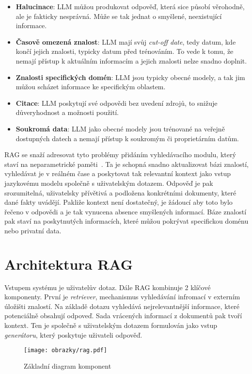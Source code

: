 \begin{itemize}
    \item \textbf{Halucinace}: LLM můžou produkovat odpověď, která sice působí věrohodně, ale je fakticky nesprávná. Může se tak jednat o smyšlené, neexistující informace.
    \item \textbf{Časově omezená znalost}: LLM mají svůj \textit{cut-off date}, tedy datum, kde končí jejich znalosti, typicky datum před trénováním. To vede k tomu, že nemají přístup k aktuálním informacím a jejich znalosti nelze snadno doplnit.
    \item \textbf{Znalosti specifických domén}: LLM jsou typicky obecné modely, a tak jim můžou scházet informace ke specifickým oblastem.
    \item \textbf{Citace}: LLM poskytují své odpovědi bez uvedení zdrojů, to snižuje důveryhodnost a možnosti použití.
    \item \textbf{Soukromá data}: LLM jako obecné modely jsou trénované na veřejně dostupných datech a nemají přístup k soukromým či proprietárním datům.
\end{itemize}

RAG se snaží adresovat tyto problémy přidáním vyhledávacího modulu, který staví na neparametrické paměti~\cite{lewis_rag}. Ta je schopná snadno aktualizovat bázi znalostí, vyhledávat je v reálném čase a poskytovat tak relevantní kontext jako vstup jazykovému modelu společně s uživatelským dotazem. Odpověď je pak srozumitelná, uživatelsky přívětivá a podložena konkrétními dokumenty, které dané fakty uvádějí. Pakliže kontext není dostatečný, je žádoucí aby toto bylo řečeno v odpovědi a je tak vynucena absence smyšlených informací. Báze znalostí pak staví na poskytnutých informacích, které můžou pokrývat specifickou doménu nebo privatní data.

\section{Architektura RAG}
Vstupem systému je uživatelův dotaz. Dále RAG kombinuje 2 klíčové komponenty. První je \textit{retriever}, mechanismus vyhledávání infromací v externím úložišti znalostí. Na základě dotazu vyhledává nejrelevantnější informace, které potenciálně obsahují odpoveď. Sada vrácených informací z dokumentů pak tvoří kontext. Ten je společně s uživatelským dotazem formulován jako vstup \textit{generátoru}, který poskytuje uživateli odpověď.

\begin{figure}[H]
    \centering
    \texttt{[image: obrazky/rag.pdf]}
    \caption{Základní diagram komponent}
    \label{fig:komponenty}
\end{figure}

